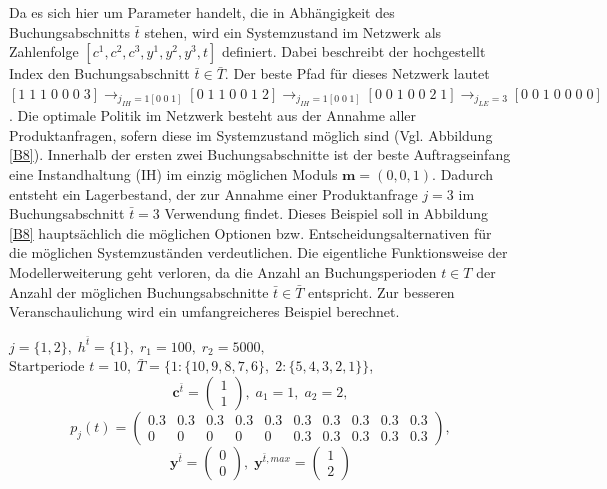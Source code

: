 Da es sich hier um Parameter handelt, die in Abhängigkeit des Buchungsabschnitts $\bar{t}$ stehen, wird ein Systemzustand im Netzwerk als Zahlenfolge $[c^1,c^2,c^3,y^1,y^2,y^3,t]$ definiert. Dabei beschreibt der hochgestellt Index den Buchungsabschnitt $\bar{t}\in\bar{T}$. Der beste Pfad für dieses Netzwerk lautet $[1\;1\;1\;0\;0\;0\;3] \rightarrow_{j_{IH}=1[0\;0\;1]} [0\;1\;1\;0\;0\;1\;2] \rightarrow_{j_{IH}=1[0\;0\;1]}  [0\;0\;1\;0\;0\;2\;1]  \rightarrow_{j_{LE}=3} [0\;0\;1\;0\;0\;0\;0]$. Die optimale Politik im Netzwerk besteht aus der Annahme aller Produktanfragen, sofern diese im Systemzustand möglich sind (Vgl. Abbildung \ref{B8}). Innerhalb der ersten zwei Buchungsabschnitte ist der beste Auftragseinfang eine Instandhaltung (IH) im einzig möglichen Moduls $\textbf{m}=(0,0,1)$. Dadurch entsteht ein Lagerbestand, der zur Annahme einer Produktanfrage $j=3$ im Buchungsabschnitt $\bar{t}=3$ Verwendung findet. Dieses Beispiel soll in Abbildung \ref{B8} hauptsächlich die möglichen Optionen bzw. Entscheidungsalternativen für die möglichen Systemzuständen verdeutlichen. Die eigentliche Funktionsweise der Modellerweiterung geht verloren, da die Anzahl an Buchungsperioden $t\in T$ der Anzahl der möglichen Buchungsabschnitte $\bar{t}\in\bar{T}$ entspricht. Zur besseren Veranschaulichung wird ein umfangreicheres Beispiel berechnet.
\begin{center}
$j = \{1, 2\}, \; h^{\bar{t}} = \{1\}, \; r_{1} = 100, \; r_{2} = 5000,$ \\
$\text{Startperiode } t=10, \; \bar{T}= \{1: \{10,9,8,7,6\},\; 2: \{5,4,3,2,1\}\}  $,
\[\textbf{c}^{\bar{t}}=\begin{pmatrix} 1\\ 1  \end{pmatrix}, \;
    a_{1}=1, \;
       a_{2}=2,   \]
         \[ p_{j}(t)=
       \begin{pmatrix}
       0.3 & 0.3 & 0.3 & 0.3 & 0.3 & 0.3 & 0.3 & 0.3 & 0.3 & 0.3\\
0 & 0 & 0 & 0 & 0 & 0.3 & 0.3 & 0.3 & 0.3 & 0.3
\end{pmatrix}, 
  \]
  \[
    \textbf{y}^{\bar{t}}= \begin{pmatrix} 0\\ 0\end{pmatrix}, \;
    \textbf{y}^{\bar{t},max}=\begin{pmatrix} 1\\ 2  \end{pmatrix}
      \]
\end{center}

